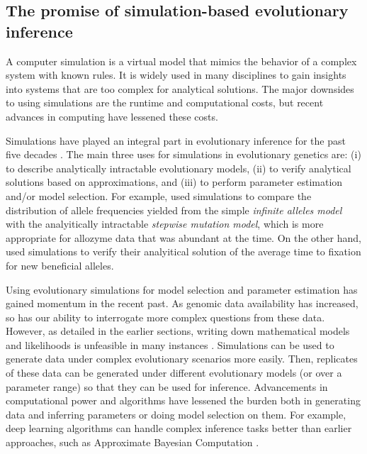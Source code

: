 \subsection{The promise of simulation-based evolutionary inference}

A computer simulation is a virtual model that mimics the behavior of a complex system with known rules.
It is widely used in many disciplines to gain insights into systems that are too complex for analytical solutions.
The major downsides to using simulations are the runtime and computational costs,
but recent advances in computing have lessened these costs.

Simulations have played an integral part in evolutionary inference for the past five decades \citep{hoban_computer_2012}.
The main three uses for simulations in evolutionary genetics are: (i) to describe analytically intractable evolutionary models, (ii) to verify analytical solutions based on approximations, and (iii) to perform parameter estimation and/or model selection.
For example, \citet{ohta_simulation_1974} used simulations to compare the distribution of allele frequencies yielded from the simple \emph{infinite alleles model} with the analyitically intractable \emph{stepwise mutation model},
which is more appropriate for allozyme data that was abundant at the time.
On the other hand, \citet{kimura_average_1980} used simulations to verify their analyitical solution of the average time to fixation for new beneficial alleles. 

Using evolutionary simulations for model selection and parameter estimation has gained momentum in the recent past.
As genomic data availability has increased, so has our ability to interrogate more complex questions from these data.
However, as detailed in the earlier sections, writing down mathematical models and likelihoods is unfeasible in many instances \citep{coop_patterns_2012}{\eg}.
Simulations can be used to generate data under complex evolutionary scenarios more easily.
Then, replicates of these data can be generated under different evolutionary models (or over a parameter range) so that they can be used for inference.
Advancements in computational power and algorithms have lessened the burden both in generating data and inferring parameters or doing model selection on them.
For example, deep learning algorithms can handle complex inference tasks better than earlier approaches, such as Approximate Bayesian Computation \citep{sheehan_deep_2016}.


